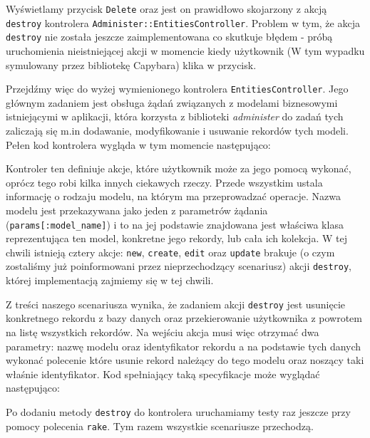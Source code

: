  Wyświetlamy przycisk \texttt{Delete} oraz jest on prawidłowo skojarzony z akcją \texttt{destroy} kontrolera \texttt{Administer::EntitiesController}. Problem w tym, że akcja \texttt{destroy} nie została jeszcze zaimplementowana co skutkuje błędem - próbą uruchomienia nieistniejącej akcji w momencie kiedy użytkownik (W tym wypadku symulowany przez bibliotekę Capybara) klika w przycisk.
  
  Przejdźmy więc do wyżej wymienionego kontrolera \texttt{EntitiesController}. Jego głównym zadaniem jest obsługa żądań związanych z modelami biznesowymi istniejącymi w aplikacji, która korzysta z biblioteki \emph{administer} do zadań tych zaliczają się m.in dodawanie, modyfikowanie i usuwanie rekordów tych modeli. Pełen kod kontrolera wygląda w tym momencie następująco:
  
  
  
  Kontroler ten definiuje akcje, które użytkownik może za jego pomocą wykonać, oprócz tego robi kilka innych ciekawych rzeczy. Przede wszystkim ustala informację o rodzaju modelu, na którym ma przeprowadzać operacje. Nazwa modelu jest przekazywana jako jeden z parametrów żądania (\verb+params[:model_name]+) i to na jej podstawie znajdowana jest właściwa klasa reprezentująca ten model, konkretne jego rekordy, lub cała ich kolekcja.
  W tej chwili istnieją cztery akcje: \texttt{new}, \texttt{create}, \texttt{edit} oraz \texttt{update} brakuje (o czym zostaliśmy już poinformowani przez nieprzechodzący scenariusz) akcji \texttt{destroy}, której implementacją zajmiemy się w tej chwili.
  
  Z treści naszego scenariusza wynika, że zadaniem akcji \texttt{destroy} jest usunięcie konkretnego rekordu z bazy danych oraz przekierowanie użytkownika z powrotem na listę wszystkich rekordów. Na wejściu akcja musi więc otrzymać dwa parametry: nazwę modelu oraz identyfikator rekordu a na podstawie tych danych wykonać polecenie które usunie rekord należący do tego modelu oraz noszący taki właśnie identyfikator. Kod spełniający taką specyfikacje może wyglądać następująco: 
  
  
  
  Po dodaniu metody \texttt{destroy} do kontrolera uruchamiamy testy raz jeszcze przy pomocy polecenia \texttt{rake}. Tym razem wszystkie scenariusze przechodzą.
  
  \clearpage
  
